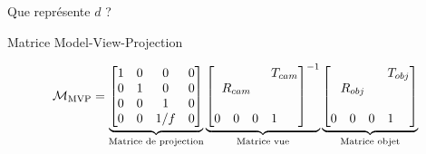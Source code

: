 \documentclass[compress]{beamer}
\def\block(#1,#2)#3{\multicolumn{#2}{c}{\multirow{#1}{*}{$ #3 $}}}
\begin{document}
\begin{frame}{}
    Que représente $d$ ?
\end{frame}

%
%

\begin{frame}{Matrice Model-View-Projection}
    \begin{center}

 {
    
    \[
    \mathcal{M}_{\text{MVP}}=
    \underbrace{
    \begin{bmatrix}
                    1 & 0 & 0 & 0  \\
                    0 & 1 & 0 & 0  \\
                    0 & 0 & 1 & 0  \\
                    0 & 0 & 1/f & 0
    \end{bmatrix}
    }_{\text{Matrice de projection}}
    \underbrace{
    \begin{bmatrix}
        \block(3,3){R_{cam}} & \block(1,3){T_{cam}} \\
                    &  &  &  \\
                    &  &  &  \\
                    0 & 0  & 0 & 1
    \end{bmatrix}^{-1}
    }_{\text{Matrice vue}}
    \underbrace{
    \begin{bmatrix}
        \block(3,3){R_{obj}} & \block(1,3){T_{obj}} \\
                    &  &  &  \\
                    &  &  &  \\
                    0 & 0  & 0 & 1
    \end{bmatrix}
    }_{\text{Matrice objet}}
    \]
}
\end{center}
\end{frame}
\end{document}
